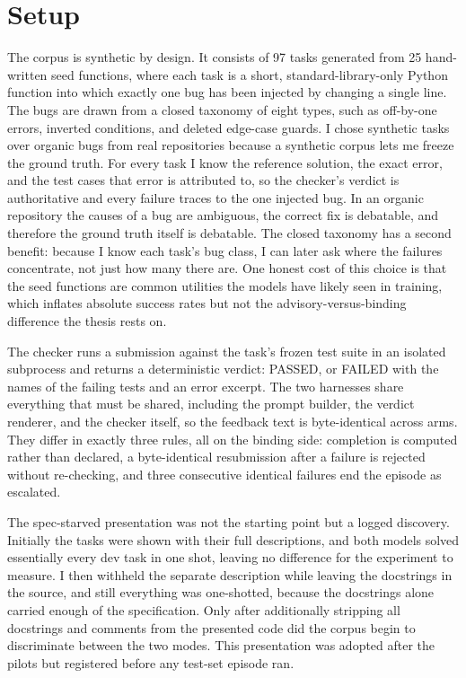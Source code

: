 \section{Setup}

The corpus is synthetic by design. It consists of 97 tasks generated from 25 hand-written seed functions, where each task is a short, standard-library-only Python function into which exactly one bug has been injected by changing a single line. The bugs are drawn from a closed taxonomy of eight types, such as off-by-one errors, inverted conditions, and deleted edge-case guards. I chose synthetic tasks over organic bugs from real repositories because a synthetic corpus lets me freeze the ground truth. For every task I know the reference solution, the exact error, and the test cases that error is attributed to, so the checker's verdict is authoritative and every failure traces to the one injected bug. In an organic repository the causes of a bug are ambiguous, the correct fix is debatable, and therefore the ground truth itself is debatable. The closed taxonomy has a second benefit: because I know each task's bug class, I can later ask where the failures concentrate, not just how many there are. One honest cost of this choice is that the seed functions are common utilities the models have likely seen in training, which inflates absolute success rates but not the advisory-versus-binding difference the thesis rests on.

The checker runs a submission against the task's frozen test suite in an isolated subprocess and returns a deterministic verdict: PASSED, or FAILED with the names of the failing tests and an error excerpt. The two harnesses share everything that must be shared, including the prompt builder, the verdict renderer, and the checker itself, so the feedback text is byte-identical across arms. They differ in exactly three rules, all on the binding side: completion is computed rather than declared, a byte-identical resubmission after a failure is rejected without re-checking, and three consecutive identical failures end the episode as escalated.

The spec-starved presentation was not the starting point but a logged discovery. Initially the tasks were shown with their full descriptions, and both models solved essentially every dev task in one shot, leaving no difference for the experiment to measure. I then withheld the separate description while leaving the docstrings in the source, and still everything was one-shotted, because the docstrings alone carried enough of the specification. Only after additionally stripping all docstrings and comments from the presented code did the corpus begin to discriminate between the two modes. This presentation was adopted after the pilots but registered before any test-set episode ran.


